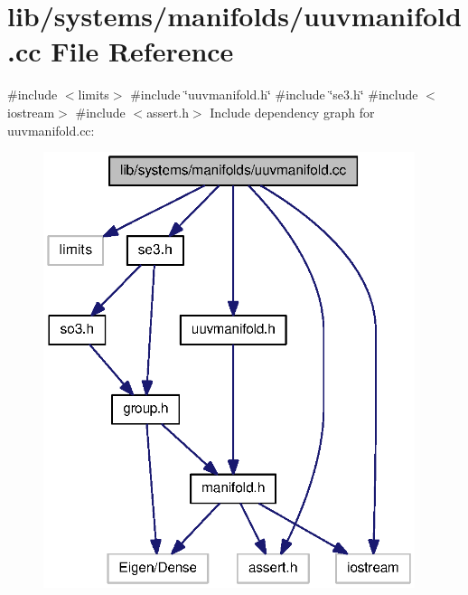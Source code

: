 \section{lib/systems/manifolds/uuvmanifold.cc \-File \-Reference}
\label{uuvmanifold_8cc}
{\ttfamily \#include $<$limits$>$}\*
{\ttfamily \#include \char`\"{}uuvmanifold.\-h\char`\"{}}\*
{\ttfamily \#include \char`\"{}se3.\-h\char`\"{}}\*
{\ttfamily \#include $<$iostream$>$}\*
{\ttfamily \#include $<$assert.\-h$>$}\*
\-Include dependency graph for uuvmanifold.\-cc\-:\nopagebreak
\begin{figure}[H]
\begin{center}
\leavevmode
\includegraphics[width=308pt]{uuvmanifold_8cc__incl}
\end{center}
\end{figure}
